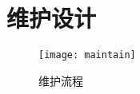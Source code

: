 \chapter{维护设计}

\begin{figure}[ht]
	\centering
	\texttt{[image: maintain]}
	\caption{维护流程} \label{fig:figure1}
\end{figure}